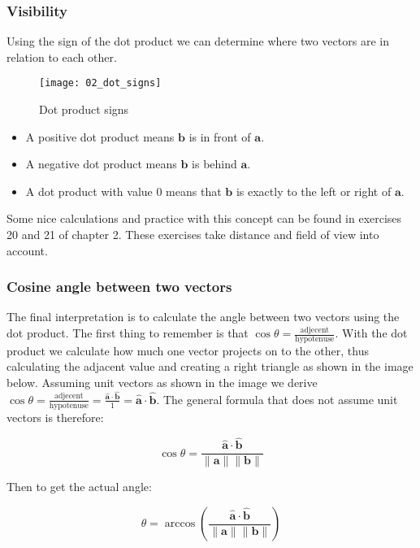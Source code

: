 \subsubsection{Visibility}

Using the sign of the dot product we can determine where two vectors are in relation to each other.

\begin{figure}[H]
\centering
    \texttt{[image: 02\_dot\_signs]}
\caption{Dot product signs}
\label{fig:dot-product-signs}
\end{figure}

\begin{itemize}
	\item A positive dot product means $\textbf{b}$ is in front of $\textbf{a}$.
	\item A negative dot product means $\textbf{b}$ is behind $\textbf{a}$.
	\item A dot product with value 0 means that $\textbf{b}$ is exactly to the left or right of $\textbf{a}$.
\end{itemize}

Some nice calculations and practice with this concept can be found in exercises 20 and 21 of chapter 2. These exercises take distance and field of view into account.

\subsubsection{Cosine angle between two vectors}

The final interpretation is to calculate the angle between two vectors using the dot product. The first thing to remember is that $\cos\theta=\frac{\text{adjecent}}{\text{hypotenuse}}$. With the dot product we calculate how much one vector projects on to the other, thus calculating the adjacent value and creating a right triangle as shown in the image below. Assuming unit vectors as shown in the image we derive $\cos\theta=\frac{\text{adjecent}}{\text{hypotenuse}}=\frac{\hat{\textbf{a}}\cdot\hat{\textbf{b}}}{1}=\hat{\textbf{a}}\cdot\hat{\textbf{b}}$. The general formula that does not assume unit vectors is therefore:

$$\cos\theta=\frac{\hat{\textbf{a}}\cdot\hat{\textbf{b}}}{\|\textbf{a}\|\|\textbf{b}\|}$$

Then to get the actual angle:

$$\theta=\arccos\left(\frac{\hat{\textbf{a}}\cdot\hat{\textbf{b}}}{\|\textbf{a}\|\|\textbf{b}\|}\right)$$

